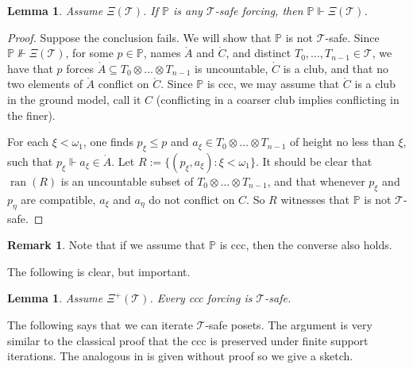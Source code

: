 \documentclass[10pt,a4paper]{amsart}
\newtheorem{lemma}[theorem]{Lemma}
\theoremstyle{definition}
\newtheorem{remark}[theorem]{Remark}
\renewcommand{\P}{\mathbb {P}}
\newcommand{\seb}{\subseteq}
\newcommand{\dt}[1]{\mathring{#1}}
\newcommand{\forces}{\Vdash}
\newcommand{\1}{\mathbf{1}}
\newcommand{\T}{\mathcal{T}}
\newcommand{\prop}{\Xi}
\newcommand{\propp}{\prop^{+}}
\DeclareMathOperator{\ran}{ran}
\begin{document}
\begin{lemma}\label{lem:safe-preserves}
  Assume $\prop(\T)$. If $\P$ is any $\T$-safe
  forcing, then $\P \forces \prop(\T)$.
\end{lemma}
\begin{proof}
  Suppose the conclusion fails. We will show that $\P$ is not $\T$-safe.
  Since $\P \not\forces \prop(\T)$, for
  some $p \in \P$, names $\dt{A}$ and $\dt{C}$, and distinct $T_{0},\dots,
  T_{n-1} \in \T$, we have that
  $p$ forces $\dt{A} \seb T_{0} \otimes \dots \otimes T_{n-1}$
  is uncountable, $\dt{C}$ is a club,
  and that no two elements of $\dt{A}$ conflict on $\dt{C}$. Since $\P$ is
  ccc, we may assume that $\dt{C}$ is a club in the ground model,
  call it $C$ (conflicting in a coarser club implies conflicting in the
  finer).

  For each $\xi < \omega_{1}$, one finds $p_{\xi} \le p$ and
  $a_{\xi} \in T_{0}\otimes \dots \otimes T_{n-1}$ of height no less than
  $\xi$, such that $p_{\xi}\forces a_{\xi} \in \dt{A}$. Let
  $R := \{(p_{\xi},a_{\xi}) : \xi < \omega_{1}\}$. It should be clear
  that $\ran(R)$ is an uncountable subset of
  $T_{0}\otimes \dots \otimes T_{n-1}$, and that whenever $p_{\xi}$ and $p_{\eta}$
  are compatible, $a_{\xi}$ and $a_{\eta}$ do not conflict on $C$.
  So $R$ witnesses that $\P$ is not $\T$-safe.
\end{proof}

\begin{remark}\label{rmk:converse-if-ccc}
  Note that if we assume that $\P$ is ccc, then the converse also holds.
\end{remark}

The following is clear, but important.

\begin{lemma}\label{lem:psi+-safe}
  Assume $\propp(\T)$. Every ccc forcing
  is $\T$-safe.
\end{lemma}

The following says that we can iterate $\T$-safe posets. The argument
is very similar to the classical proof that the ccc is preserved under
finite support iterations. The analogous
in \cite{ShelahAbraham} is given without proof so we give a sketch.
\end{document}
